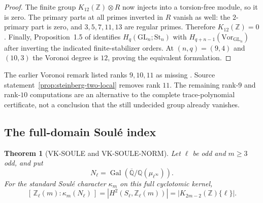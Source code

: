 \documentclass[11pt,a4paper]{article}
\newtheorem{theorem}{Theorem}[section]
\theoremstyle{definition}
\begin{document}
\begin{proof}
The finite group $K_{12}(\mathbb Z)\otimes R$ now injects into a
torsion-free module, so it is zero. The primary parts at all primes
inverted in $R$ vanish as well: the $2$-primary part is zero, and
$3,5,7,11,13$ are regular primes. Therefore $K_{12}(\mathbb Z)=0$.
Finally, Proposition~1.5 of \cite{DEKM2026} identifies
$H_q(\mathrm{GL}_n;\mathrm{St}_n)$ with
$H_{q+n-1}(\mathrm{Vor}_{\mathrm{GL}_n})$ after inverting the
indicated finite-stabilizer orders. At $(n,q)=(9,4)$ and $(10,3)$
the Voronoi degree is $12$, proving the equivalent formulation.
\end{proof}

The earlier Voronoi remark listed ranks $9,10,11$ as missing
\cite[Remark~6.6, author-preprint p.~19]{DEKM2026}.
Source statement~\ref{prop:steinberg-two-local} removes rank $11$.
The remaining rank-$9$ and rank-$10$ computations are an alternative
to the complete trace-polynomial certificate, not a conclusion
that the still undecided group already vanishes.

\subsection{The full-domain Soul\'e index}

\begin{theorem}[VK-SOULE and VK-SOULE-NORM]
Let \(\ell\) be odd and \(m\ge3\) odd, and put
\[
 N_\ell=\operatorname{Gal}
   (\overline{\mathbb Q}/\mathbb Q(\mu_{\ell^\infty})).
\]
For the standard Soul\'e character \(\kappa_m\) on this
full cyclotomic kernel,
\[
 [\,\mathbb Z_\ell(m):\kappa_m(N_\ell)\,]
   =|H^2(S_\ell,\mathbb Z_\ell(m))|
   =|K_{2m-2}(\mathbb Z)\{\ell\}|.                   \tag{K18}
\]
\end{theorem}
\end{document}
